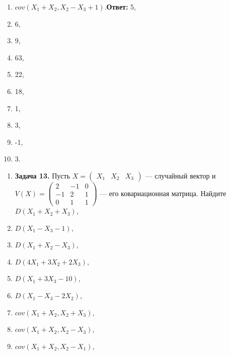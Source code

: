 \begin{enumerate}
\item  $cov(X_{1} +X_{2} ,X_{2} -X_{3} +1)$.\textbf{Ответ:} 5,

\item  6,

\item  9,

\item  63,

\item  22,

\item  18,

\item  1,

\item  3,

\item  -1,

\item  3.
\end{enumerate}

 

\begin{enumerate}
\item \textbf{Задача 13. }Пусть $X=(\begin{array}{ccc} {X_{1} } & {X_{2} } & {X_{3} } \end{array})$ --- случайный вектор и $V\left(X\right)=\left(\begin{array}{ccc} {2} & {-1} & {0} \\ {-1} & {2} & {1} \\ {0} & {1} & {1} \end{array}\right)$ --- его ковариационная матрица. Найдите $D(X_{1} +X_{2} +X_{3} )$,

\item  $D(X_{1} -X_{3} -1)$,

\item  $D(X_{1} +X_{2} -X_{3} )$,

\item  $D(4X_{1} +3X_{2} +2X_{3} )$,

\item  $D(X_{1} +3X_{3} -10)$,

\item  $D(X_{1} -X_{3} -2X_{2} )$,

\item  $cov(X_{1} +X_{2} ,X_{2} +X_{3} )$,

\item  $cov(X_{1} +X_{2} ,X_{2} -X_{3} )$,

\item  $cov(X_{1} +X_{2} ,X_{2} -X_{1} )$,
\end{enumerate}

